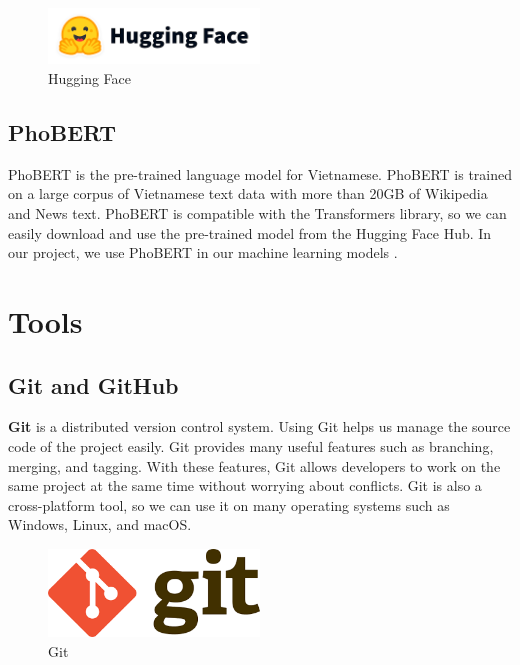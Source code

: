 \begin{figure}[ht]
    \centering
    \includegraphics[width=0.5\textwidth]{Images/8.Technology_Stack/huggingface_logo.png}
    \caption{Hugging Face}
    \label{fig:huggingface}
\end{figure}

\subsection{PhoBERT}
PhoBERT is the pre-trained language model for Vietnamese. PhoBERT is trained on a large corpus of Vietnamese text data with more than 20GB of Wikipedia and News text. PhoBERT is compatible with the Transformers library, so we can easily download and use the pre-trained model from the Hugging Face Hub. In our project, we use PhoBERT in our machine learning models \cite{phobert}.

\section{Tools}

\subsection{Git and GitHub}
\textbf{Git} is a distributed version control system. Using Git helps us manage the source code of the project easily. Git provides many useful features such as branching, merging, and tagging. With these features, Git allows developers to work on the same project at the same time without worrying about conflicts. Git is also a cross-platform tool, so we can use it on many operating systems such as Windows, Linux, and macOS.

\begin{figure}[ht]
    \centering
    \includegraphics[width=0.5\textwidth]{Images/8.Technology_Stack/git_logo.png}
    \caption{Git}
    \label{fig:git}
\end{figure}

